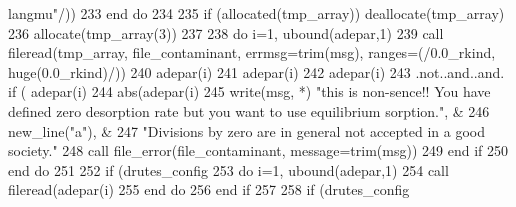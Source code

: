 \begin{DoxyCode}
{{{{{{{{{{{{      langmu\textcolor{stringliteral}{"/))}
233 \textcolor{stringliteral}{}\textcolor{stringliteral}{      end do}
234 \textcolor{stringliteral}{}\textcolor{stringliteral}{      }
235 \textcolor{stringliteral}{}\textcolor{stringliteral}{      if (allocated(tmp\_array)) deallocate(tmp\_array)}
236 \textcolor{stringliteral}{}\textcolor{stringliteral}{      allocate(tmp\_array(3))}
237 \textcolor{stringliteral}{}\textcolor{stringliteral}{      }
238 \textcolor{stringliteral}{}\textcolor{stringliteral}{      do i=1, ubound(adepar,1)}
239 \textcolor{stringliteral}{}\textcolor{stringliteral}{        call fileread(tmp\_array, file\_contaminant, errmsg=trim(msg), ranges=(/0.0\_rkind, huge(0.0\_rkind)/))}
240 \textcolor{stringliteral}{}\textcolor{stringliteral}{        adepar(i)%
241 \textcolor{stringliteral}{}\textcolor{stringliteral}{        adepar(i)%
242 \textcolor{stringliteral}{}\textcolor{stringliteral}{        adepar(i)%
243 \textcolor{stringliteral}{}.not..and..and.\textcolor{stringliteral}{ if ( adepar(i)%
244 \textcolor{stringliteral}{}\textcolor{stringliteral}{        abs(adepar(i)%
245 \textcolor{stringliteral}{}\textcolor{stringliteral}{          write(msg, *) "}this is non-sence\textcolor{comment}{!! You have defined zero desorption rate but you want to use
       equilibrium sorption.", &}
246           new\_line(\textcolor{stringliteral}{"a"}), &
247           \textcolor{stringliteral}{"Divisions by zero are in general not accepted in a good society."}
248           \textcolor{keyword}{call }file_error(file_contaminant, message=trim(msg))
249 \textcolor{keywordflow}{        end if}
250 \textcolor{keywordflow}{      end do}
251       
252       \textcolor{keywordflow}{if} (drutes_config%
253         \textcolor{keywordflow}{do} i=1, ubound(adepar,1)
254           \textcolor{keyword}{call }fileread(adepar(i)%
255 \textcolor{comment}{}\textcolor{keywordflow}{        end do}
256 \textcolor{keywordflow}{      end if}
257       
258       \textcolor{keywordflow}{if} (drutes_config%
}}}}}}}}}}}}}}}}}
\end{DoxyCode}
